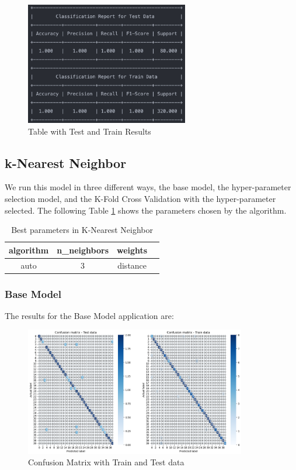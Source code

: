 \documentclass[conference]{IEEEtran}
\begin{document}
\begin{figure}[!h!]
    \includegraphics[width=2.8in]{SVC/r_3.png}%
    \caption{Table with Test and Train Results}%
    \label{fig:conf_gnb_r_3}%
\end{figure}

\subsection{k-Nearest Neighbor}

We run this model in three different ways, the base model, the hyper-parameter selection model, and the K-Fold Cross Validation with the hyper-parameter selected. The following Table \ref{tab:tab5} shows the parameters chosen by the algorithm.

\begin{table}[h!]
    \centering
    \begin{tabular}{||c c c c||} 
     \hline
     algorithm & n_neighbors & weights \\[0.5ex] 
     \hline\hline
     auto & 3 & distance \\ 
    \hline
    \end{tabular}
    \caption{Best parameters in K-Nearest Neighbor} 
    \label{tab:tab5}
\end{table}
\subsubsection{Base Model}
The results for the Base Model application are:

\begin{figure}[!h!]
    \includegraphics[width=3.8in]{k-NN/1.png}%
    \caption{Confusion Matrix with Train and Test data}%
    \label{fig:conf_gnb_1}%
\end{figure}
\end{document}
